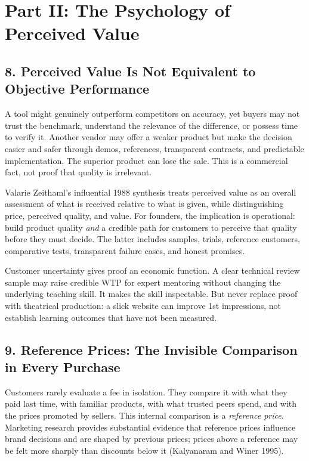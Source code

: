 \section*{Part II: The Psychology of Perceived Value}

\subsection*{8. Perceived Value Is Not Equivalent to Objective Performance}

A tool might genuinely outperform competitors on accuracy, yet buyers may not trust the benchmark, understand the relevance of the difference, or possess time to verify it. Another vendor may offer a weaker product but make the decision easier and safer through demos, references, transparent contracts, and predictable implementation. The superior product can lose the sale. This is a commercial fact, not proof that quality is irrelevant.

Valarie Zeithaml's influential 1988 synthesis treats perceived value as an overall assessment of what is received relative to what is given, while distinguishing price, perceived quality, and value. For founders, the implication is operational: build product quality \emph{and} a credible path for customers to perceive that quality before they must decide. The latter includes samples, trials, reference customers, comparative tests, transparent failure cases, and honest promises.

Customer uncertainty gives proof an economic function. A clear technical review sample may raise credible WTP for expert mentoring without changing the underlying teaching skill. It makes the skill inspectable. But never replace proof with theatrical production: a slick website can improve 1st impressions, not establish learning outcomes that have not been measured.

\subsection*{9. Reference Prices: The Invisible Comparison in Every Purchase}

Customers rarely evaluate a fee in isolation. They compare it with what they paid last time, with familiar products, with what trusted peers spend, and with the prices promoted by sellers. This internal comparison is a \emph{reference price}. Marketing research provides substantial evidence that reference prices influence brand decisions and are shaped by previous prices; prices above a reference may be felt more sharply than discounts below it (Kalyanaram and Winer 1995).

